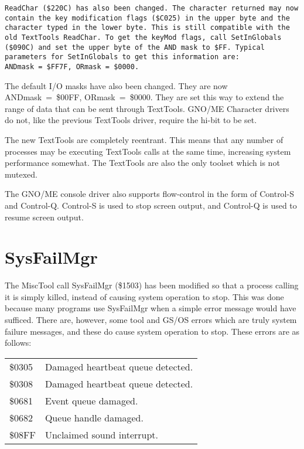 \documentclass{report}
\begin{document}
\tt ReadChar \rm (\$220C) has also been changed. The character returned may now
contain the key modification flags (\$C025) in the upper byte and
the character typed in the lower byte. This is still compatible
with the old TextTools ReadChar. To get the keyMod flags, call
\tt SetInGlobals \rm (\$090C) and
set the upper byte of the AND mask to \$FF. Typical parameters for
\tt SetInGlobals \rm to get this information are:
ANDmask\ =\ \$FF7F, ORmask\ =\ \$0000.


The default I/O masks have also been
changed. They are now 
ANDmask\ =\ \$00FF, ORmask\ =\ \$0000. They are
set this way to extend the range of data that can be sent through
TextTools. GNO/ME Character drivers do not, like the previous
TextTools driver, require the hi-bit to be set.

The new TextTools are completely reentrant.
This means that any number of processes may be executing
TextTools calls at the same time, increasing system performance
somewhat. The TextTools are also the only toolset which is not
mutexed.

The GNO/ME console driver also supports
flow-control in the form of Control-S and Control-Q. Control-S is
used to stop screen output, and Control-Q is used to resume
screen output.

\section{SysFailMgr}


The MiscTool call SysFailMgr (\$1503) has been
modified so that a process calling it is simply killed, instead
of causing system operation to stop. This was done because many
programs use SysFailMgr when a simple error message would have
sufficed. There are, however, some tool and GS/OS errors which
are truly system failure messages, and these do cause system
operation to stop. These errors are as follows:

\begin{tabular}{ll}
\$0305	& Damaged heartbeat queue detected. \\
\$0308	& Damaged heartbeat queue detected. \\
\$0681	& Event queue damaged. \\
\$0682	& Queue handle damaged. \\
\$08FF	& Unclaimed sound interrupt. \\
\end{tabular}
\end{document}

